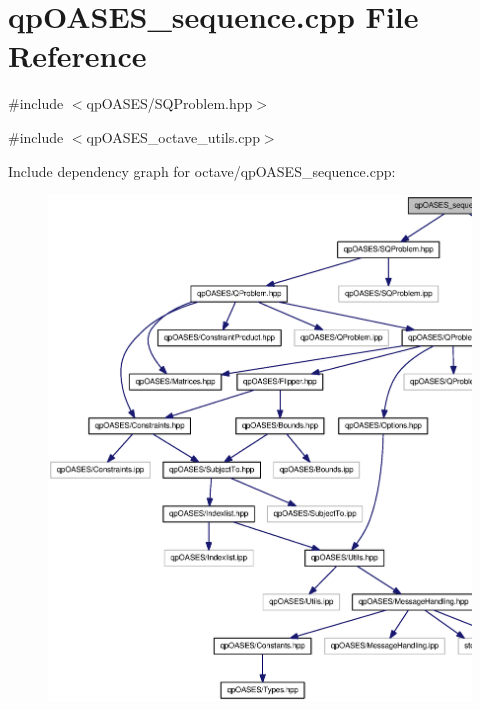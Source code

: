 \section{qpOASES\_\-sequence.cpp File Reference}
\label{octave_2qpOASES__sequence_8cpp}
{\ttfamily \#include $<$qpOASES/SQProblem.hpp$>$}\par
{\ttfamily \#include $<$qpOASES\_\-octave\_\-utils.cpp$>$}\par
Include dependency graph for octave/qpOASES\_\-sequence.cpp:
\nopagebreak
\begin{figure}[H]
\begin{center}
\leavevmode
\includegraphics[width=400pt]{octave_2qpOASES__sequence_8cpp__incl}
\end{center}
\end{figure}
